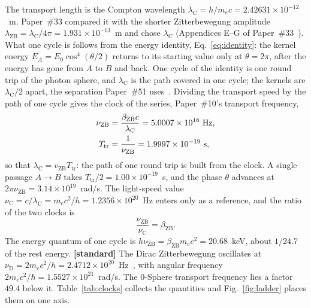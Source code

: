 \documentclass[%
 reprint, amsmath,amssymb, aps, prb, ]{revtex4-2}
\numberwithin{equation}{section}
\newcommand{\vZB}{v_{\text{ZB}}}
\newcommand{\betaZB}{\beta_{\text{ZB}}}
\newcommand{\lambdaC}{\lambda_{\text{C}}}
\newcommand{\lambdaZB}{\lambda_{\text{ZB}}}
\newcommand{\nuZB}{\nu_{\text{ZB}}}
\newcommand{\nuC}{\nu_{\text{C}}}
\newcommand{\nuD}{\nu_{\text{D}}}
\newcommand{\Ttr}{T_{\text{tr}}}
\begin{document}
The transport length is the Compton wavelength $\lambdaC = h/m_ec = 2.42631\times10^{-12}$~m. Paper~\#33 compared it with the shorter Zitterbewegung amplitude $\lambdaZB = \lambdaC/4\pi = 1.931\times10^{-13}$~m and chose $\lambdaC$ (Appendices E--G of Paper~\#33~\cite{hanamura33}). What one cycle is follows from the energy identity, Eq.~\eqref{eq:identity}: the kernel energy $E_A = E_0\cos^{4}(\theta/2)$ returns to its starting value only at $\theta = 2\pi$, after the energy has gone from $A$ to $B$ and back. One cycle of the identity is one round trip of the photon sphere, and $\lambdaC$ is the path covered in one cycle; the kernels are $\lambdaC/2$ apart, the separation Paper~\#51 uses~\cite{hanamura51}. Dividing the transport speed by the path of one cycle gives the clock of the series, Paper~\#10's transport frequency,
\begin{align}
\nuZB &= \frac{\betaZB c}{\lambdaC} = 5.0007\times10^{18}~\text{Hz},
\label{eq:nuZB}\\
\Ttr &= \frac{1}{\nuZB} = 1.9997\times10^{-19}~\text{s},
\notag
\end{align}
so that $\lambdaC = \vZB\Ttr$: the path of one round trip is built from the clock. A single passage $A\to B$ takes $\Ttr/2 = 1.00\times10^{-19}$~s, and the phase $\theta$ advances at $2\pi\nuZB = 3.14\times10^{19}$~rad/s. The light-speed value $\nuC = c/\lambdaC = m_ec^{2}/h = 1.2356\times10^{20}$~Hz enters only as a reference, and the ratio of the two clocks is
\begin{equation}
\frac{\nuZB}{\nuC} = \betaZB .
\label{eq:ratio}
\end{equation}
The energy quantum of one cycle is $h\nuZB = \betaZB m_ec^{2} = 20.68$~keV, about $1/24.7$ of the rest energy. \textbf{[standard]} The Dirac Zitterbewegung oscillates at $\nuD = 2m_ec^{2}/h = 2.4712\times10^{20}$~Hz~\cite{Schrodinger1930}, with angular frequency $2m_ec^{2}/\hbar = 1.5527\times10^{21}$~rad/s. The 0-Sphere transport frequency lies a factor $49.4$ below it. Table~\ref{tab:clocks} collects the quantities and Fig.~\ref{fig:ladder} places them on one axis.
\end{document}
